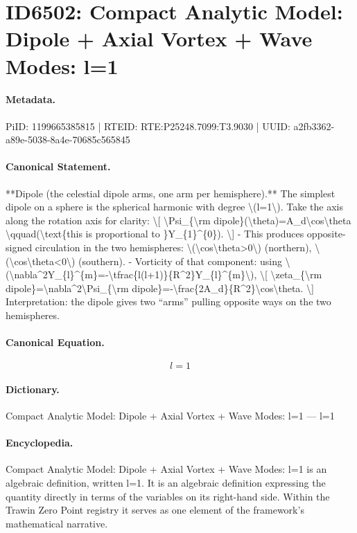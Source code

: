 \section*{ID6502: Compact Analytic Model: Dipole + Axial Vortex + Wave Modes: l=1}
\paragraph{Metadata.}
PiID: 1199665385815 | RTEID: RTE:P25248.7099:T3.9030 | UUID: a2fb3362-a89e-5038-8a4e-70685c565845

\paragraph{Canonical Statement.}
**Dipole (the celestial dipole arms, one arm per hemisphere).** The simplest dipole on a sphere is the spherical harmonic with degree \textbackslash{}(l=1\textbackslash{}). Take the axis along the rotation axis for clarity: \textbackslash{}[ \textbackslash{}Psi\_\{\textbackslash{}rm dipole\}(\textbackslash{}theta)=A\_d\textbackslash{}cos\textbackslash{}theta \textbackslash{}qquad(\textbackslash{}text\{this is proportional to \}Y\_\{1\}\textasciicircum{}\{0\}). \textbackslash{}] - This produces opposite-signed circulation in the two hemispheres: \textbackslash{}(\textbackslash{}cos\textbackslash{}theta>0\textbackslash{}) (northern), \textbackslash{}(\textbackslash{}cos\textbackslash{}theta<0\textbackslash{}) (southern). - Vorticity of that component: using \textbackslash{}(\textbackslash{}nabla\textasciicircum{}2Y\_\{l\}\textasciicircum{}\{m\}=-\textbackslash{}tfrac\{l(l+1)\}\{R\textasciicircum{}2\}Y\_\{l\}\textasciicircum{}\{m\}\textbackslash{}), \textbackslash{}[ \textbackslash{}zeta\_\{\textbackslash{}rm dipole\}=\textbackslash{}nabla\textasciicircum{}2\textbackslash{}Psi\_\{\textbackslash{}rm dipole\}=-\textbackslash{}frac\{2A\_d\}\{R\textasciicircum{}2\}\textbackslash{}cos\textbackslash{}theta. \textbackslash{}] Interpretation: the dipole gives two “arms” pulling opposite ways on the two hemispheres.

\paragraph{Canonical Equation.}
\[
l=1
\]

\paragraph{Dictionary.}
Compact Analytic Model: Dipole + Axial Vortex + Wave Modes: l=1 — l=1

\paragraph{Encyclopedia.}
Compact Analytic Model: Dipole + Axial Vortex + Wave Modes: l=1 is an algebraic definition, written l=1. It is an algebraic definition expressing the quantity directly in terms of the variables on its right-hand side. Within the Trawin Zero Point registry it serves as one element of the framework's mathematical narrative.
